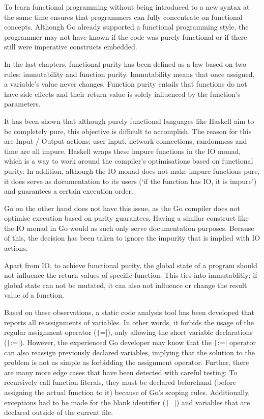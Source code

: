 

To learn functional programming without being introduced to a new syntax at the same time
ensures that programmers can fully concentrate on functional concepts. Although Go already
supported a functional programming style, the programmer may not have known if the code was
purely functional or if there still were imperative constructs embedded.

In the last chapters, functional purity has been defined as a law based on two rules; immutability
and function purity. Immutability means that once assigned, a variable's value never
changes. Function purity entails that functions do not have side effects and their return
value is solely influenced by the function's parameters.

It has been shown that although purely functional languages like Haskell aim to be completely
pure, this objective is difficult to accomplish. The reason for this are Input / Output actions; user
input, network connections, randomness and time are all impure. Haskell wraps
these impure functions in the IO monad, which is a way to work around the compiler's optimisations
based on functional purity. In addition, although the IO monad does not make impure functions pure, it
does serve as documentation to its users (`if the function has IO, it is impure') and
guarantees a certain execution order.

Go on the other hand does not have this issue, as the Go compiler does not optimise execution
based on purity guarantees. Having a similar construct like the IO monad in Go would as such
only serve documentation purposes. Because of this, the decision has been taken to ignore
the impurity that is implied with IO actions.

Apart from IO, to achieve functional purity, the global state of a program should not influence
the return values of specific function. This ties into immutablitiy; if global state can
not be mutated, it can also not influence or change the result value of a function.

Based on these observations, a static code analysis tool has been developed that reports
all reassignments of variables. In other words, it forbids the usage of the regular
assignment operator (\texttt|=|), only allowing the short variable declarations
(\texttt|:=|). However, the experienced Go developer may know that the \texttt|:=|
operator can also reassign previously declared variables, implying that the solution to the
problem is not as simple as forbidding the assignment operator.
Further, there are many more edge cases that have been detected with careful testing:
To recursively call function literals, they must be declared beforehand (before assigning
the actual function to it) because of Go's scoping rules. Additionally, exceptions
had to be made for the blank identifier (\texttt|_|) and variables that are declared
outside of the current file.

